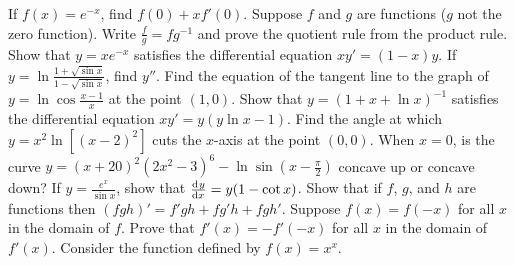 \begin{questions}
\begin{multicols}{2}
    \end{multicols}
  \questioA If $ f(x) = e^{-x} $, find $ f(0) + xf'(0) $.
  \questioM Suppose $ f $ and $ g $ are functions ($ g $ not the zero function). Write $ \frac{f}{g} = fg^{-1} $ and
            prove the quotient rule from the product rule.
  \questioM Show that $ y = xe^{-x} $ satisfies the differential equation $ xy' = (1-x)y $.
  \questioM If $ y = \ln \frac{1 + \sqrt{\sin x}}{1 - \sqrt{\sin x}} $, find $ y'' $.
  \questioM Find the equation of the tangent line to the graph of $ y = \ln \cos \frac{x - 1}{x} $ at
            the point $(1, 0)$.
  \questioM Show that $ y = (1 + x + \ln x)^{-1} $ satisfies the differential equation $ xy' = y(y \ln x - 1) $.
  \questioE Find the angle at which $ y = x^2 \ln [(x - 2)^2] $ cuts the $ x$-axis at the point $ (0,0) $.
  \questioM When $ x = 0 $, is the curve $ y = (x + 20)^2 (2x^2 - 3)^6 - \ln \sin (x - \frac{\pi}{2}) $ concave up or concave down?
  \questioM If $ y = \frac{e^x}{\sin x} $, show that $ \od{y}{x} = y(1 - \cot x) $.
  \questioM Show that if $ f $, $ g $, and $ h $ are functions then $ (fgh)' = f'gh + fg'h + fgh' $.
  \questioE Suppose $ f(x) = f(-x) $ for all $ x $ in the domain of $ f $. Prove that $ f'(x) = -f'(-x) $ for all $ x $
            in the domain of $ f'(x) $.
  \questioE Consider the function defined by $ f(x) = x^x $.
\end{questions}
